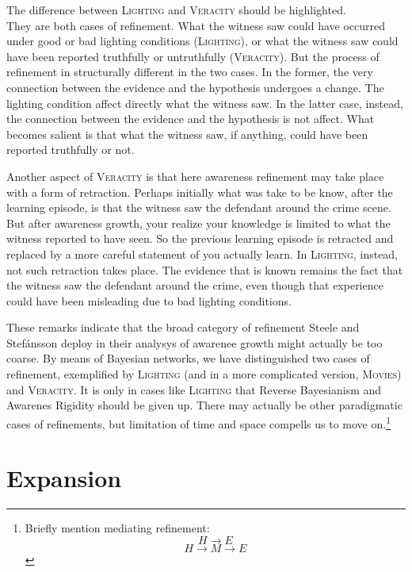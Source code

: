 \documentclass[
  11pt,
  dvipsnames,enabledeprecatedfontcommands]{scrartcl}
\begin{document}
The difference between \textsc{Lighting} and \textsc{Veracity} should be
highlighted.\\
They are both cases of refinement. What the witness saw could have
occurred under good or bad lighting conditions (\textsc{Lighting}), or
what the witness saw could have been reported truthfully or untruthfully
(\textsc{Veracity}). But the process of refinement in structurally
different in the two cases. In the former, the very connection between
the evidence and the hypothesis undergoes a change. The lighting
condition affect directly what the witness saw. In the latter case,
instead, the connection between the evidence and the hypothesis is not
affect. What becomes salient is that what the witness saw, if anything,
could have been reported truthfully or not.

Another aspect of \textsc{Veracity} is that here awareness refinement
may take place with a form of retraction. Perhaps initially what was
take to be know, after the learning episode, is that the witness saw the
defendant around the crime scene. But after awareness growth, your
realize your knowledge is limited to what the witness reported to have
seen. So the previous learning episode is retracted and replaced by a
more careful statement of you actually learn. In \textsc{Lighting},
instead, not such retraction takes place. The evidence that is known
remains the fact that the witness saw the defendant around the crime,
even though that experience could have been misleading due to bad
lighting conditions.

These remarks indicate that the broad category of refinement Steele and
Stefánsson deploy in their analysys of awarenee growth might actually be
too coarse. By means of Bayesian networks, we have distinguished two
cases of refinement, exemplified by \textsc{Lighting} (and in a more
complicated version, \textsc{Movies}) and \textsc{Veracity}. It is only
in cases like \textsc{Lighting} that Reverse Bayesianism and Awarenes
Rigidity should be given up. There may actually be other paradigmatic
cases of refinements, but limitation of time and space compells us to
move on.\footnote{Briefly mention mediating refinement:
  \[H\rightarrow E\] \[H\rightarrow M \rightarrow E\]}

\hypertarget{expansion}{%
\section{Expansion}\label{expansion}}
\end{document}

